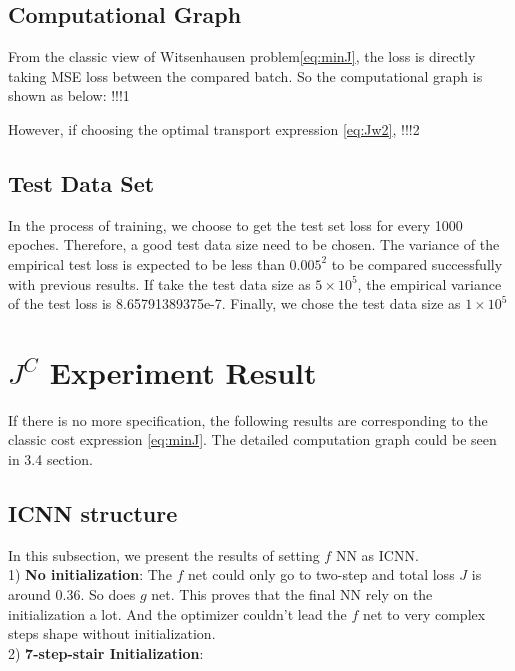 \documentclass[conference,compsoc]{IEEEtran}
\begin{document}
\subsection{Computational Graph}
From the classic view of Witsenhausen problem\eqref{eq:minJ}, the loss is directly taking MSE loss between the compared batch. So the computational graph is shown as below:
!!!1

However, if choosing the optimal transport expression \eqref{eq:Jw2}, !!!2

\subsection{Test Data Set}
In the process of training, we choose to get the test set loss for every 1000 epoches. Therefore, a good test data size need to be chosen. The variance of the empirical test loss is expected to be less than $0.005^2$ to be compared successfully with previous results. If take the test data size as $5\times10^5$, the empirical variance of the test loss is 8.65791389375e-7. Finally, we chose the test data size as $1\times10^5$

\section{$J^C$ Experiment Result}
If there is no more specification, the following results are corresponding to the classic cost expression \eqref{eq:minJ}. The detailed computation graph could be seen in 3.4 section.
\subsection{ICNN structure}
In this subsection, we present the results of setting $f$ NN as ICNN. \\

1) \textbf{No initialization}:
The $f$ net could only go to two-step and total loss $J$ is around 0.36. So does $g$ net. This proves that the final NN rely on the initialization a lot. And the optimizer couldn't lead the $f$ net to very complex steps shape without initialization.\\

2) \textbf{7-step-stair Initialization}:
\end{document}

